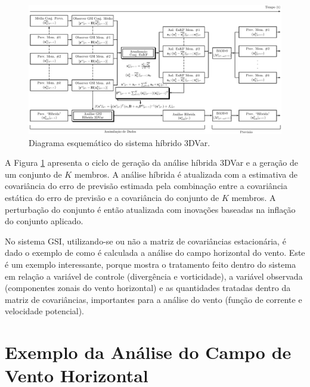 \begin{figure}[H]
  \vspace{-8mm}
  \caption{Diagrama esquemático do sistema híbrido 3DVar.}
  \vspace{2mm}
  \begin{center}
    \includegraphics[scale=0.82,angle=90]{./figs/cap4/diagrama_hibrido_novo_pt-tempos.pdf}
  \end{center}
  \vspace{2mm}
  \label{fig:ciclohyb}
\end{figure}

A Figura \ref{fig:ciclohyb} apresenta o ciclo de geração da análise híbrida 3DVar e a geração de um conjunto de $K$ membros. A análise híbrida é atualizada com a estimativa de covariância do erro de previsão estimada pela combinação entre a covariância estática do erro de previsão e a covariância do conjunto de $K$ membros. A perturbação do conjunto é então atualizada com inovações baseadas na inflação do conjunto aplicado. %

No sistema GSI, utilizando-se ou não a matriz de covariâncias estacionária, é dado o exemplo de como é calculada a análise do campo horizontal do vento. Este é um exemplo interessante, porque mostra o tratamento feito dentro do sistema em relação a variável de controle (divergência e vorticidade), a variável observada (componentes zonais do vento horizontal) e as quantidades tratadas dentro da matriz de covariâncias, importantes para a análise do vento (função de corrente e velocidade potencial).

\section{Exemplo da Análise do Campo de Vento Horizontal}
\label{sec:ex_anl_wind}

